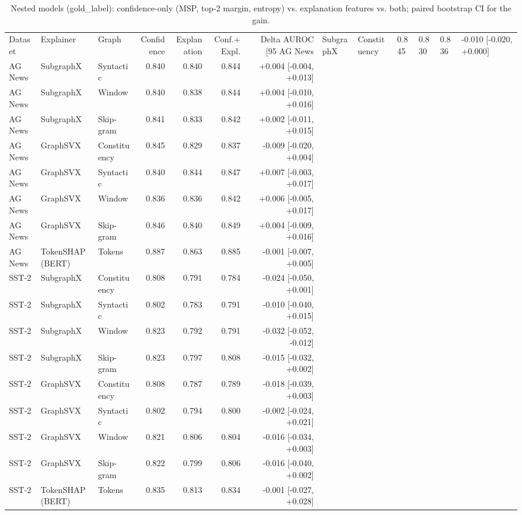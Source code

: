 \begin{table}[H]
\centering
\small
\caption{Nested models (gold_label): confidence-only (MSP, top-2 margin, entropy) vs. explanation features vs. both; paired bootstrap CI for the gain.}
\label{tab:nested_gold_label}
\begin{tabular}{lllrrrr}
\toprule
Dataset & Explainer & Graph & Confidence & Explanation & Conf.+Expl. & Delta AUROC [95%
\midrule
AG News & SubgraphX & Constituency & 0.845 & 0.830 & 0.836 & -0.010 [-0.020, +0.000] \\
AG News & SubgraphX & Syntactic & 0.840 & 0.840 & 0.844 & +0.004 [-0.004, +0.013] \\
AG News & SubgraphX & Window & 0.840 & 0.838 & 0.844 & +0.004 [-0.010, +0.016] \\
AG News & SubgraphX & Skip-gram & 0.841 & 0.833 & 0.842 & +0.002 [-0.011, +0.015] \\
AG News & GraphSVX & Constituency & 0.845 & 0.829 & 0.837 & -0.009 [-0.020, +0.004] \\
AG News & GraphSVX & Syntactic & 0.840 & 0.844 & 0.847 & +0.007 [-0.003, +0.017] \\
AG News & GraphSVX & Window & 0.836 & 0.836 & 0.842 & +0.006 [-0.005, +0.017] \\
AG News & GraphSVX & Skip-gram & 0.846 & 0.840 & 0.849 & +0.004 [-0.009, +0.016] \\
AG News & TokenSHAP (BERT) & Tokens & 0.887 & 0.863 & 0.885 & -0.001 [-0.007, +0.005] \\
SST-2 & SubgraphX & Constituency & 0.808 & 0.791 & 0.784 & -0.024 [-0.050, +0.001] \\
SST-2 & SubgraphX & Syntactic & 0.802 & 0.783 & 0.791 & -0.010 [-0.040, +0.015] \\
SST-2 & SubgraphX & Window & 0.823 & 0.792 & 0.791 & -0.032 [-0.052, -0.012] \\
SST-2 & SubgraphX & Skip-gram & 0.823 & 0.797 & 0.808 & -0.015 [-0.032, +0.002] \\
SST-2 & GraphSVX & Constituency & 0.808 & 0.787 & 0.789 & -0.018 [-0.039, +0.003] \\
SST-2 & GraphSVX & Syntactic & 0.802 & 0.794 & 0.800 & -0.002 [-0.024, +0.021] \\
SST-2 & GraphSVX & Window & 0.821 & 0.806 & 0.804 & -0.016 [-0.034, +0.003] \\
SST-2 & GraphSVX & Skip-gram & 0.822 & 0.799 & 0.806 & -0.016 [-0.040, +0.002] \\
SST-2 & TokenSHAP (BERT) & Tokens & 0.835 & 0.813 & 0.834 & -0.001 [-0.027, +0.028] \\
\bottomrule
\end{tabular}
\end{table}

